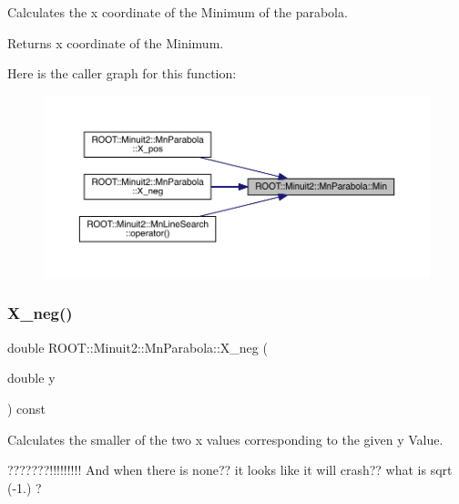 Calculates the x coordinate of the Minimum of the parabola.

\begin{DoxyReturn}{Returns}
x coordinate of the Minimum. 
\end{DoxyReturn}
Here is the caller graph for this function\+:
\nopagebreak
\begin{figure}[H]
\begin{center}
\leavevmode
\includegraphics[width=350pt]{db/d7d/classROOT_1_1Minuit2_1_1MnParabola_ab3c7e51f6276d9ebf6d28fe965914bc8_icgraph}
\end{center}
\end{figure}
\mbox{\label{classROOT_1_1Minuit2_1_1MnParabola_a16f7f02dd1cb070e89fb007331066ee3}} 
\subsubsection{\texorpdfstring{X\_neg()}{X\_neg()}\hspace{0.1cm}{\footnotesize\ttfamily [1/3]}}
{\footnotesize\ttfamily double R\+O\+O\+T\+::\+Minuit2\+::\+Mn\+Parabola\+::\+X\+\_\+neg (\begin{DoxyParamCaption}\item[{double}]{y }\end{DoxyParamCaption}) const\hspace{0.3cm}{\ttfamily [inline]}}

Calculates the smaller of the two x values corresponding to the given y Value.

???????!!!!!!!!! And when there is none?? it looks like it will crash?? what is sqrt (-\/1.) ?



